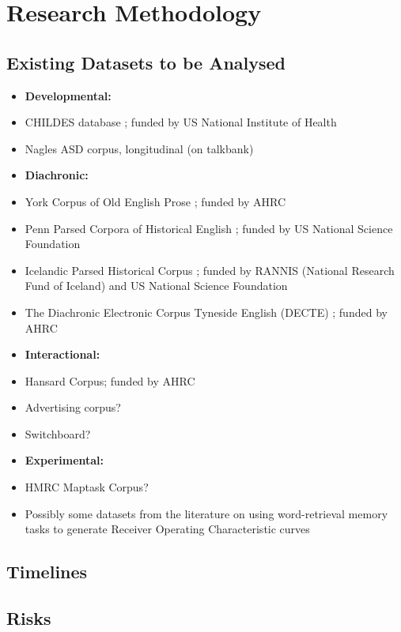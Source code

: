 \documentclass[11pt]{article}
\begin{document}
\section{Research Methodology}
\subsection{Existing Datasets to be Analysed}
\begin{itemize}
	\item[] \textbf{Developmental:}
	\item CHILDES database \citep{macwhinney1996,macwhinney2014}; funded by US National Institute of Health
	\item Nagles ASD corpus, longitudinal (on talkbank)
	\item[] \textbf{Diachronic:}
	\item York Corpus of Old English Prose \citep{ycoe}; funded by AHRC
	\item Penn Parsed Corpora of Historical English \citep{ppcme24, ppceme, ppcmbe2}; funded by US National Science Foundation
	\item Icelandic Parsed Historical Corpus \citep{icepahc09}; funded by RANNIS (National Research Fund of Iceland) and US National Science Foundation
	\item The Diachronic Electronic Corpus Tyneside English (DECTE) \cite{decte}; funded by AHRC
	\item[] \textbf{Interactional:}
	\item Hansard Corpus; funded by AHRC
	\item Advertising corpus?
	\item Switchboard?
	\item[] \textbf{Experimental:}
	\item HMRC Maptask Corpus?
	\item Possibly some datasets from the literature on using word-retrieval memory tasks to generate Receiver Operating Characteristic curves
\end{itemize}

\subsection{Timelines}

\subsection{Risks}
\end{document}
